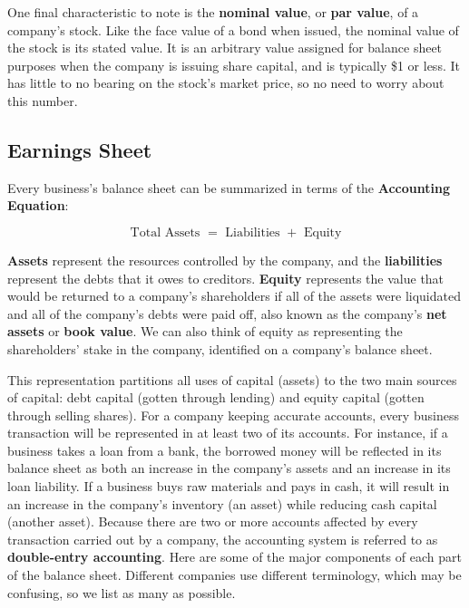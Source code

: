 \documentclass{article}
\begin{document}
    \begin{definition}
      One final characteristic to note is the \textbf{nominal value}, or \textbf{par value}, of a company's stock. Like the face value of a bond when issued, the nominal value of the stock is its stated value. It is an arbitrary value assigned for balance sheet purposes when the company is issuing share capital, and is typically \$1 or less. It has little to no bearing on the stock's market price, so no need to worry about this number.
    \end{definition}

  \subsection{Earnings Sheet}

    Every business's balance sheet can be summarized in terms of the \textbf{Accounting Equation}:

    \begin{equation}
      \text{Total Assets } = \text{ Liabilities } + \text{ Equity}
    \end{equation}

    \textbf{Assets} represent the resources controlled by the company, and the \textbf{liabilities} represent the debts that it owes to creditors. \textbf{Equity} represents the value that would be returned to a company's shareholders if all of the assets were liquidated and all of the company's debts were paid off, also known as the company's \textbf{net assets} or \textbf{book value}. We can also think of equity as representing the shareholders' stake in the company, identified on a company's balance sheet.

    This representation partitions all uses of capital (assets) to the two main sources of capital: debt capital (gotten through lending) and equity capital (gotten through selling shares). For a company keeping accurate accounts, every business transaction will be represented in at least two of its accounts. For instance, if a business takes a loan from a bank, the borrowed money will be reflected in its balance sheet as both an increase in the company's assets and an increase in its loan liability. If a business buys raw materials and pays in cash, it will result in an increase in the company's inventory (an asset) while reducing cash capital (another asset). Because there are two or more accounts affected by every transaction carried out by a company, the accounting system is referred to as \textbf{double-entry accounting}. Here are some of the major components of each part of the balance sheet. Different companies use different terminology, which may be confusing, so we list as many as possible.
\end{document}
